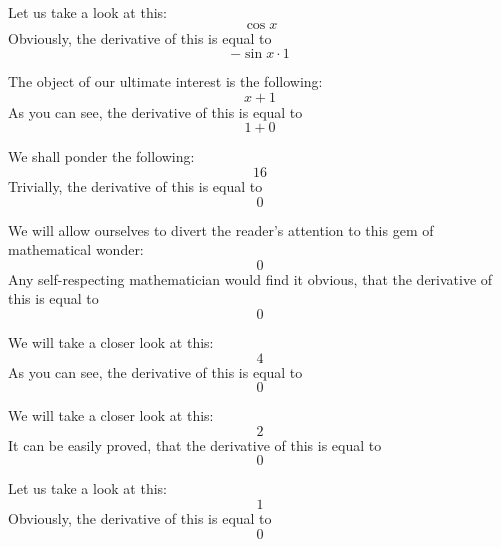 \documentclass{article}
\begin{document}
Let us take a look at this:
\begin{equation}
\cos x 
\end{equation}
Obviously, the derivative of this is equal to
\begin{equation}
-\sin x \cdot 1 
\end{equation}

The object of our ultimate interest is the following:
\begin{equation}
x + 1 
\end{equation}
As you can see, the derivative of this is equal to
\begin{equation}
1 + 0 
\end{equation}

We shall ponder the following:
\begin{equation}
16 
\end{equation}
Trivially, the derivative of this is equal to
\begin{equation}
0 
\end{equation}

We will allow ourselves to divert the reader's attention to this gem of mathematical wonder:
\begin{equation}
0 
\end{equation}
Any self-respecting mathematician would find it obvious, that the derivative of this is equal to
\begin{equation}
0 
\end{equation}

We will take a closer look at this:
\begin{equation}
4 
\end{equation}
As you can see, the derivative of this is equal to
\begin{equation}
0 
\end{equation}

We will take a closer look at this:
\begin{equation}
2 
\end{equation}
It can be easily proved, that the derivative of this is equal to
\begin{equation}
0 
\end{equation}

Let us take a look at this:
\begin{equation}
1 
\end{equation}
Obviously, the derivative of this is equal to
\begin{equation}
0 
\end{equation}
\end{document}
